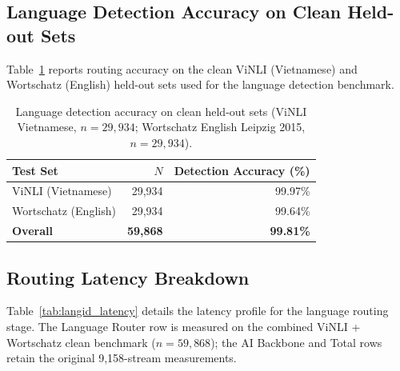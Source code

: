 \documentclass[runningheads]{llncs}
\begin{document}
\begin{table}[H]
\centering
\caption{Language detection routing confusion matrix ($n=9{,}158$). Rows: Actual ground-truth language; Columns: Router output decision.}
\label{tab:langid_full}
\scriptsize
\setlength{\tabcolsep}{2pt}
\end{table}

\subsection{Language Detection Accuracy on Clean Held-out Sets}
Table~\ref{tab:langid_robustness} reports routing accuracy on the clean ViNLI (Vietnamese) and Wortschatz (English) held-out sets used for the language detection benchmark.

\begin{table}[H]
\centering
\caption{Language detection accuracy on clean held-out sets (ViNLI Vietnamese, $n=29{,}934$; Wortschatz English Leipzig 2015, $n=29{,}934$).}
\label{tab:langid_robustness}
\begin{tabular}{lrr}
\toprule
Test Set & $N$ & Detection Accuracy (\%) \\
\midrule
ViNLI (Vietnamese) & 29,934 & 99.97\% \\
Wortschatz (English) & 29,934 & 99.64\% \\
\midrule
\textbf{Overall} & \textbf{59,868} & \textbf{99.81\%} \\
\bottomrule
\end{tabular}
\end{table}

\subsection{Routing Latency Breakdown}
Table~\ref{tab:langid_latency} details the latency profile for the language routing stage. The Language Router row is measured on the combined ViNLI + Wortschatz clean benchmark ($n=59{,}868$); the AI Backbone and Total rows retain the original 9,158-stream measurements.
\end{document}
